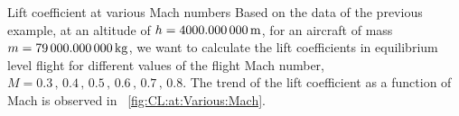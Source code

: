 \documentclass[[12pt,twoside]{book}
\begin{document}
%

%
\begin{myExampleX}{Lift coefficient at various Mach numbers}{}%
\label{example:Lift:Coefficient:At:Various:Mach}
%
\noindent
Based on the data of the previous example, at an altitude of $h=\SI[round-precision=0]{\myAltitudeM}{m}$, for an aircraft of mass $m=\SI[round-precision=0]{\myMassKg}{kg}$, we want to calculate the lift coefficients in equilibrium level flight for different values of the flight Mach number, $M = 0.3\,,\, 0.4\,,\, 0.5\,,\, 0.6\,,\, 0.7\,,\, 0.8$. The trend of the lift coefficient as a function of Mach is observed in \figurename~\vref{fig:CL:at:Various:Mach}.
%
\myTableDataset

\of{\myTableDataset}

\of{\myTableDataset}

\of{\myTableDataset}

\of{\myTableDataset}

\of{\myTableDataset}
%


\end{myExampleX}
\end{document}

